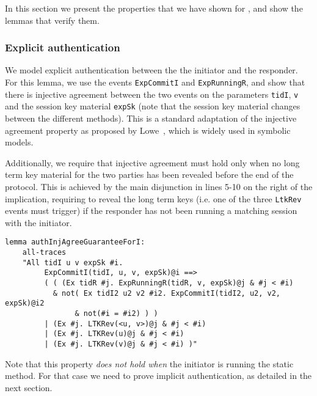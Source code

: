 In this section we present the properties that we have shown for
\mEdhoc, and show the lemmas that verify them.

\subsubsection{Explicit authentication}

We model explicit authentication between the the initiator and the
responder.
%
For this lemma, we use the events \lstinline{ExpCommitI} and
\lstinline{ExpRunningR}, and show that there is injective agreement
between the two events on the parameters \lstinline{tidI},
\lstinline{v} and the session key material \lstinline{expSk} (note
that the session key material changes between the different \mEdhoc
methods).
%
This is a standard adaptation of the injective agreement property as
proposed by Lowe~\cite{lowes-paper}, which is widely used in symbolic
models. 

Additionally, we require that injective agreement must hold only when
no long term key material for the two parties has been revealed before
the end of the protocol.
%
This is achieved by the main disjunction in lines 5-10 on the right of
the implication, requiring to reveal the long term keys (i.e. one of
the three \lstinline{LtkRev} events must trigger) if the responder has
not been running a matching session with the initiator.

\begin{lstlisting}
lemma authInjAgreeGuaranteeForI:
    all-traces
    "All tidI u v expSk #i.
         ExpCommitI(tidI, u, v, expSk)@i ==>
         ( ( (Ex tidR #j. ExpRunningR(tidR, v, expSk)@j & #j < #i)
           & not( Ex tidI2 u2 v2 #i2. ExpCommitI(tidI2, u2, v2, expSk)@i2
                & not(#i = #i2) ) )
         | (Ex #j. LTKRev(<u, v>)@j & #j < #i)
         | (Ex #j. LTKRev(u)@j & #j < #i)
         | (Ex #j. LTKRev(v)@j & #j < #i) )"
\end{lstlisting}

Note that this property \emph{does not hold when} the initiator is
running the static method.
%
For that case we need to prove implicit authentication, as detailed in
the next section.

